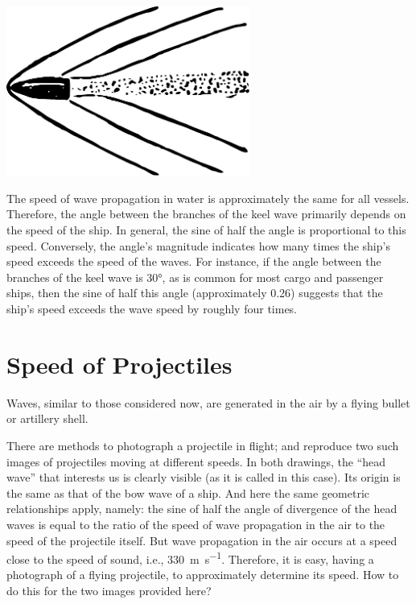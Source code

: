 \begin{marginfigure}[2cm]%
\centering
\includegraphics[width=0.6\textwidth]{figures/ch-02/fig-051.pdf}
\end{marginfigure}


The speed of wave propagation in water is approximately the same for all vessels. Therefore, the angle between the branches of the keel wave primarily depends on the speed of the ship. In general, the sine of half the angle is proportional to this speed. Conversely, the angle's magnitude indicates how many times the ship's speed exceeds the speed of the waves. For instance, if the angle between the branches of the keel wave is \ang{30}, as is common for most cargo and passenger ships, then the sine of half this angle (approximately 0.26) suggests that the ship's speed exceeds the wave speed by roughly four times.

\section{Speed of Projectiles}
\label{sec-2.14}

\ques Waves, similar to those considered now, are generated in the air by a flying bullet or artillery shell.

There are methods to photograph a projectile in flight;  and  reproduce two such images of projectiles moving at different speeds. In both drawings, the ``head wave'' that interests us is clearly visible (as it is called in this case). Its origin is the same as that of the bow wave of a ship. And here the same geometric relationships apply, namely: the sine of half the angle of divergence of the head waves is equal to the ratio of the speed of wave propagation in the air to the speed of the projectile itself. But wave propagation in the air occurs at a speed close to the speed of sound, i.e., \SI{330}{\meter\per\second}. Therefore, it is easy, having a photograph of a flying projectile, to approximately determine its speed. How to do this for the two images provided here?

